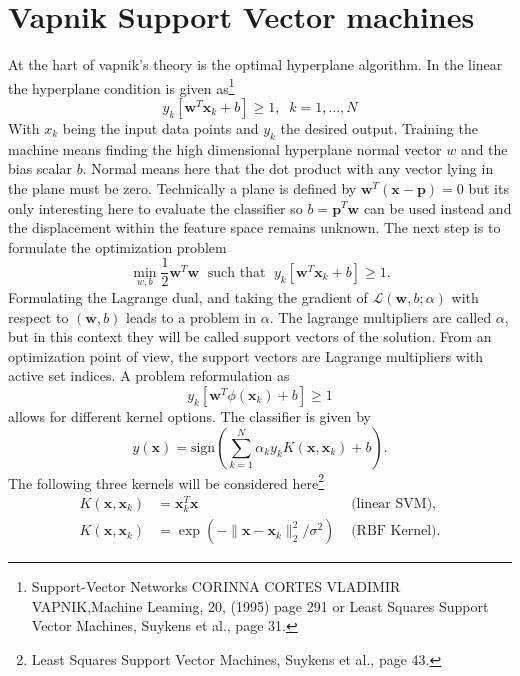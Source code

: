 \section{Vapnik Support Vector machines}
At the hart of vapnik's theory is the optimal hyperplane algorithm. In the linear the hyperplane condition is given as\footnote{Support-Vector Networks
CORINNA CORTES VLADIMIR VAPNIK,Machine Leaming, 20, (1995) page 291 or Least Squares Support Vector Machines, Suykens et al., page 31.}
\begin{equation}
y_k [\mathbf{w}^T \mathbf{x}_k + b] \geq 1, \;\; k = 1,\dots,N
\end{equation}
With $x_k$ being the input data points and $y_k$ the desired output. Training the machine means finding the high dimensional hyperplane normal vector $w$ and the bias scalar $b$. Normal means here that the dot product with any vector lying in the plane must be zero. Technically a plane is defined by $\mathbf{w}^T(\mathbf{x} - \mathbf{p}) = 0$ but its only interesting here to evaluate the classifier so $b = \mathbf{p}^T \mathbf{w}$ can be used instead and the displacement within the feature space remains unknown.
The next step is to formulate the optimization problem
\begin{equation}
\min_{w,b} \frac{1}{2} \mathbf{w}^T \mathbf{w} \;\text{ such that }\; y_k [\mathbf{w}^T \mathbf{x}_k + b] \geq 1.
\end{equation}
Formulating the Lagrange dual, and taking the gradient of $\mathcal{L}(\mathbf{w},b;\alpha)$ with respect to $(\mathbf{w},b)$ leads to a problem in $\alpha$. The lagrange multipliers are called $\alpha$, but in this context they will be called support vectors of the solution. From an optimization point of view, the support vectors are Lagrange multipliers with active set indices. A problem reformulation as
\begin{equation}
y_k [\mathbf{w}^T \phi(\mathbf{x}_k) + b] \geq 1
\end{equation}
allows for different kernel options. The classifier is given by
\begin{equation}
y(\mathbf{x}) = \text{sign}(\sum^N_{k=1} \alpha_k y_k K(\mathbf{x},\mathbf{x}_k) + b).
\end{equation}
The following three kernels will be considered here\footnote{Least Squares Support Vector Machines, Suykens et al., page 43.}
\begin{align}
K(\mathbf{x},\mathbf{x}_k)  &= \mathbf{x}_k^T \mathbf{x} &\text{  (linear SVM)}, \\
K(\mathbf{x}, \mathbf{x}_k) &= \exp (-\| \mathbf{x} - \mathbf{x}_k \|^2_2 / \sigma^2) &\text{  (RBF Kernel)}.
\end{align}

